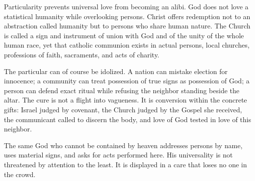 Particularity prevents universal love from becoming an alibi. God does not love a statistical humanity while overlooking persons. Christ offers redemption not to an abstraction called humanity but to persons who share human nature. The Church is called a sign and instrument of union with God and of the unity of the whole human race, yet that catholic communion exists in actual persons, local churches, professions of faith, sacraments, and acts of charity.

The particular can of course be idolized. A nation can mistake election for innocence; a community can treat possession of true signs as possession of God; a person can defend exact ritual while refusing the neighbor standing beside the altar. The cure is not a flight into vagueness. It is conversion within the concrete gifts: Israel judged by covenant, the Church judged by the Gospel she received, the communicant called to discern the body, and love of God tested in love of this neighbor.

The same God who cannot be contained by heaven addresses persons by name, uses material signs, and asks for acts performed here. His universality is not threatened by attention to the least. It is displayed in a care that loses no one in the crowd.
